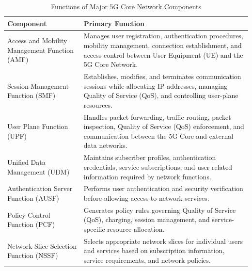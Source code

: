 \documentclass[12pt,a4paper]{report}
\begin{document}
	\begin{table}[H]
		\centering
		\caption{Functions of Major 5G Core Network Components}
		\label{tab:5gc_components}
		
		\begin{tabular}{|p{3cm}|p{10cm}|}
			\hline
			
			\textbf{Component} &
			\textbf{Primary Function}
			\\
			\hline
			
			Access and Mobility Management Function (AMF) &
			Manages user registration, authentication procedures, mobility management, connection establishment, and access control between User Equipment (UE) and the 5G Core Network.
			\\
			\hline
			
			Session Management Function (SMF) &
			Establishes, modifies, and terminates communication sessions while allocating IP addresses, managing Quality of Service (QoS), and controlling user-plane resources.
			\\
			\hline
			
			User Plane Function (UPF) &
			Handles packet forwarding, traffic routing, packet inspection, Quality of Service (QoS) enforcement, and communication between the 5G Core and external data networks.
			\\
			\hline
			
			Unified Data Management (UDM) &
			Maintains subscriber profiles, authentication credentials, service subscriptions, and user-related information required by network functions.
			\\
			\hline
			
			Authentication Server Function (AUSF) &
			Performs user authentication and security verification before allowing access to network services.
			\\
			\hline
			
			Policy Control Function (PCF) &
			Generates policy rules governing Quality of Service (QoS), charging, session management, and service-specific resource allocation.
			\\
			\hline
			
			Network Slice Selection Function (NSSF) &
			Selects appropriate network slices for individual users and services based on subscription information, service requirements, and network policies.
			\\
			\hline
			
		\end{tabular}
		
	\end{table}
	
\end{document}
